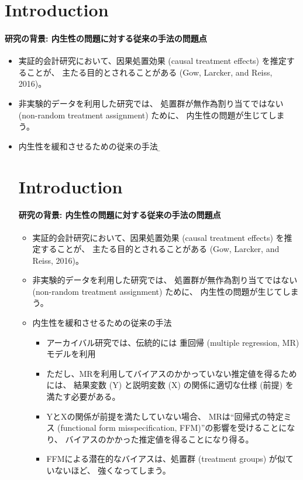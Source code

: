 \section{Introduction}

\paragraph{研究の背景: 内生性の問題に対する従来の手法の問題点}
\begin{itemize}
 \item 実証的会計研究において、因果処置効果 (causal treatment effects) を推定することが、
       主たる目的とされることがある (Gow, Larcker, and Reiss, 2016)。
 \item 非実験的データを利用した研究では、
       処置群が無作為割り当てではない (non-random treatment assignment) ために、
       内生性の問題が生じてしまう。
 \item 内生性を緩和させるための従来の手法
       \b\section{Introduction}

\paragraph{研究の背景: 内生性の問題に対する従来の手法の問題点}
\begin{itemize}
 \item 実証的会計研究において、因果処置効果 (causal treatment effects) を推定することが、
       主たる目的とされることがある (Gow, Larcker, and Reiss, 2016)。
 \item 非実験的データを利用した研究では、
       処置群が無作為割り当てではない (non-random treatment assignment) ために、
       内生性の問題が生じてしまう。
 \item 内生性を緩和させるための従来の手法
       \begin{itemize}
        \item アーカイバル研究では、伝統的には
              重回帰 (multiple regression, MR) モデルを利用
        \item ただし、MRを利用してバイアスのかかっていない推定値を得るためには、
              結果変数 (Y) と説明変数 (X) の関係に適切な仕様 (前提) を満たす必要がある。
        \item YとXの関係が前提を満たしていない場合、
              MRは``回帰式の特定ミス (functional form misspecification, FFM)''の影響を受けることになり、
              バイアスのかかった推定値を得ることになり得る。
        \item FFMによる潜在的なバイアスは、処置群 (treatment groups) が似ていないほど、
              強くなってしまう。
       \end{itemize}
\end{itemize}


\end{itemize}
